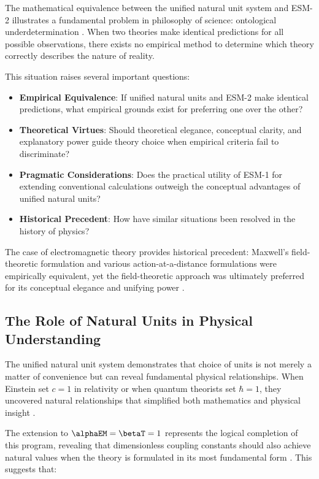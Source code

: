 	The mathematical equivalence between the unified natural unit system and ESM-2 illustrates a fundamental problem in philosophy of science: ontological underdetermination \cite{Duhem1906,Quine1951}. When two theories make identical predictions for all possible observations, there exists no empirical method to determine which theory correctly describes the nature of reality.
	
	This situation raises several important questions:
	
	\begin{itemize}
		\item \textbf{Empirical Equivalence}: If unified natural units and ESM-2 make identical predictions, what empirical grounds exist for preferring one over the other?
		\item \textbf{Theoretical Virtues}: Should theoretical elegance, conceptual clarity, and explanatory power guide theory choice when empirical criteria fail to discriminate? \cite{Kuhn1977}
		\item \textbf{Pragmatic Considerations}: Does the practical utility of ESM-1 for extending conventional calculations outweigh the conceptual advantages of unified natural units?
		\item \textbf{Historical Precedent}: How have similar situations been resolved in the history of physics? \cite{Poincare1905}
	\end{itemize}
	
	The case of electromagnetic theory provides historical precedent: Maxwell's field-theoretic formulation and various action-at-a-distance formulations were empirically equivalent, yet the field-theoretic approach was ultimately preferred for its conceptual elegance and unifying power \cite{Maxwell1873}.
	
	\subsection{The Role of Natural Units in Physical Understanding}
	\label{subsec:natural_units_understanding}
	
	The unified natural unit system demonstrates that choice of units is not merely a matter of convenience but can reveal fundamental physical relationships. When Einstein set $c = 1$ in relativity or when quantum theorists set $\hbar = 1$, they uncovered natural relationships that simplified both mathematics and physical insight \cite{Einstein1905,Dirac1927}.
	
	The extension to $\alphaEM = \betaT = 1$ represents the logical completion of this program, revealing that dimensionless coupling constants should also achieve natural values when the theory is formulated in its most fundamental form \cite{pascher_unified_2025}. This suggests that:
	

